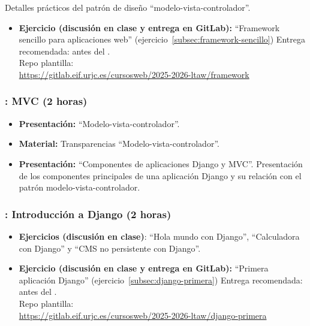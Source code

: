 \documentclass[a4paper,12pt]{article}
\begin{document}
Detalles prácticos del patrón de diseño ``modelo-vista-controlador''.

\begin{itemize}
  \item \textbf{Ejercicio (discusión en clase y entrega en GitLab):} ``Framework sencillo para aplicaciones web'' (ejercicio~\ref{subsec:framework-sencillo})
  Entrega recomendada: antes del \martesI. \\
  Repo plantilla: \\ {\footnotesize \url{https://gitlab.eif.urjc.es/cursosweb/2025-2026-ltaw/framework}}
\end{itemize}


\subsubsection{\lunesI: MVC (2 horas)}
\label{cal:lunesI}

\begin{itemize}
\item \textbf{Presentación:} ``Modelo-vista-controlador''.
\item \textbf{Material:} Transparencias ``Modelo-vista-controlador''.
\item \textbf{Presentación:} ``Componentes de aplicaciones Django y MVC''.
  Presentación de los componentes principales de una aplicación Django y su relación con el patrón modelo-vista-controlador.
\end{itemize}

\subsubsection{\martesI: Introducción a Django (2 horas)}
\label{cal:martesI}

\begin{itemize}
  \item \textbf{Ejercicios (discusión en clase)}: ``Hola mundo con Django'', ``Calculadora con Django'' y ``CMS no persistente con Django''.
  \item \textbf{Ejercicio (discusión en clase y entrega en GitLab):} ``Primera aplicación Django'' (ejercicio~\ref{subsec:django-primera})
  Entrega recomendada: antes del \martesJ. \\
  Repo plantilla: \\ {\footnotesize \url{https://gitlab.eif.urjc.es/cursosweb/2025-2026-ltaw/django-primera}}
\end{itemize}
\end{document}
